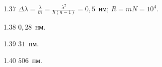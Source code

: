 \begin{Solution}{1.{37}}
        $\Delta\lambda = \frac{\lambda}{m} = \frac{\lambda^2}{h(n-1)} = 0,5$~нм; $R = mN = 10^4$.
    
\end{Solution}
\begin{Solution}{1.{38}}
        $0,28$~нм.
    
\end{Solution}
\begin{Solution}{1.{39}}
        $31$~пм.
    
\end{Solution}
\begin{Solution}{1.{40}}
        $506$~пм.
    
\end{Solution}
